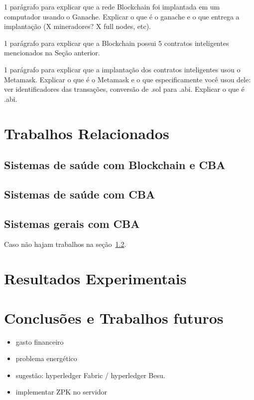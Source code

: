 \documentclass[a4paper,11pt]{article}
\begin{document}
{\color{Magenta} 1 parágrafo para explicar que a rede Blockchain foi implantada em um computador usando o Ganache. Explicar o que é o ganache e o que entrega a implantação (X mineradores? X full nodes, etc).}

{\color{Magenta} 1 parágrafo para explicar que a Blockchain possui 5 contratos inteligentes mencionados na Seção anterior.}

{\color{Magenta} 1 parágrafo para explicar que a implantação dos contratos inteligentes usou o Metamask. Explicar o que é o Metamask e o que especificamente você usou dele: ver identificadores das transações, conversão de .sol para .abi. Explicar o que é .abi.}

\newpage
\section{Trabalhos Relacionados}

\subsection{Sistemas de saúde com Blockchain e CBA}

\subsection{Sistemas de saúde com CBA}
\label{sub:sec:saude-cba}

\subsection{Sistemas gerais com CBA}

Caso não hajam trabalhos na seção~\ref{sub:sec:saude-cba}.

\newpage
\section{Resultados Experimentais}



\newpage
\section{Conclusões e Trabalhos futuros}

\begin{itemize}
  \item gasto financeiro
  \item problema energético
  \item sugestão: hyperledger Fabric / hyperledger Besu.
  \item implementar ZPK no servidor
\end{itemize}
\end{document}
